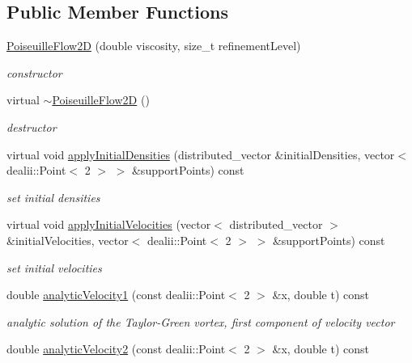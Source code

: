 \subsection*{Public Member Functions}
\begin{DoxyCompactItemize}
\item 
\hyperlink{classnatrium_1_1PoiseuilleFlow2D_a1834e3440ac19a8734f9133cd577e0ca}{Poiseuille\-Flow2\-D} (double viscosity, size\-\_\-t refinement\-Level)
\begin{DoxyCompactList}\small\item\em constructor \end{DoxyCompactList}\item 
\hypertarget{classnatrium_1_1PoiseuilleFlow2D_a62f9e7cfb2e32753b58eafb9d5936fd4}{virtual \hyperlink{classnatrium_1_1PoiseuilleFlow2D_a62f9e7cfb2e32753b58eafb9d5936fd4}{$\sim$\-Poiseuille\-Flow2\-D} ()}\label{classnatrium_1_1PoiseuilleFlow2D_a62f9e7cfb2e32753b58eafb9d5936fd4}

\begin{DoxyCompactList}\small\item\em destructor \end{DoxyCompactList}\item 
virtual void \hyperlink{classnatrium_1_1PoiseuilleFlow2D_a5f3475deac6f2666f181a052baf76502}{apply\-Initial\-Densities} (distributed\-\_\-vector \&initial\-Densities, vector$<$ dealii\-::\-Point$<$ 2 $>$ $>$ \&support\-Points) const 
\begin{DoxyCompactList}\small\item\em set initial densities \end{DoxyCompactList}\item 
virtual void \hyperlink{classnatrium_1_1PoiseuilleFlow2D_a8fe39ca61c90d194255e61d36c0681af}{apply\-Initial\-Velocities} (vector$<$ distributed\-\_\-vector $>$ \&initial\-Velocities, vector$<$ dealii\-::\-Point$<$ 2 $>$ $>$ \&support\-Points) const 
\begin{DoxyCompactList}\small\item\em set initial velocities \end{DoxyCompactList}\item 
\hypertarget{classnatrium_1_1PoiseuilleFlow2D_a7900b79dac4dc5c120d9a04d9d4138ac}{double \hyperlink{classnatrium_1_1PoiseuilleFlow2D_a7900b79dac4dc5c120d9a04d9d4138ac}{analytic\-Velocity1} (const dealii\-::\-Point$<$ 2 $>$ \&x, double t) const }\label{classnatrium_1_1PoiseuilleFlow2D_a7900b79dac4dc5c120d9a04d9d4138ac}

\begin{DoxyCompactList}\small\item\em analytic solution of the Taylor-\/\-Green vortex, first component of velocity vector \end{DoxyCompactList}\item 
\hypertarget{classnatrium_1_1PoiseuilleFlow2D_a373b2da2beb5eb83eb5caab3a421e356}{double \hyperlink{classnatrium_1_1PoiseuilleFlow2D_a373b2da2beb5eb83eb5caab3a421e356}{analytic\-Velocity2} (const dealii\-::\-Point$<$ 2 $>$ \&x, double t) const }\label{classnatrium_1_1PoiseuilleFlow2D_a373b2da2beb5eb83eb5caab3a421e356}


\end{DoxyCompactItemize}
